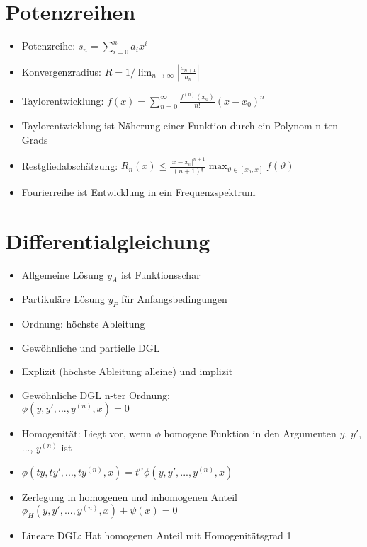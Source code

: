 \documentclass[a4paper,10pt]{article}
\begin{document}
\begin{multicols}{2}
\section {Potenzreihen}
\begin{itemize}
\item Potenzreihe: $s_n = \sum_{i=0}^n a_i x^i$
\item Konvergenzradius: $R = 1/\lim_{n \to \infty} |\frac{a_{n+1}}{a_n}|$
\item Taylorentwicklung: $f(x)=\sum_{n=0}^{\infty} \frac{f^{(n)}(x_0)}{n!} (x-x_0)^n$
\item Taylorentwicklung ist Näherung einer Funktion durch ein Polynom n-ten Grads
\item Restgliedabschätzung: $R_n(x) \le \frac{|x-x_0|^{n+1}}{(n+1)!} \max_{\vartheta \in [x_0,x]} f(\vartheta)$
\item Fourierreihe ist Entwicklung in ein Frequenzspektrum
\end{itemize}

\section {Differentialgleichung}
\begin{itemize}
\item Allgemeine Lösung $y_A$ ist Funktionsschar
\item Partikuläre Lösung $y_P$ für Anfangsbedingungen
\item Ordnung: höchste Ableitung
\item Gewöhnliche und partielle DGL
\item Explizit (höchste Ableitung alleine) und implizit
\item Gewöhnliche DGL n-ter Ordnung:\\
$\phi(y,y',...,y^{(n)},x) = 0$
\item Homogenität: Liegt vor, wenn $\phi$ homogene Funktion in den Argumenten $y$, $y'$, $...$, $y^{(n)}$ ist
\item $\phi(ty,ty',...,ty^{(n)},x) = t^\alpha \phi(y,y',...,y^{(n)},x)$
\item Zerlegung in homogenen und inhomogenen Anteil $\phi_H(y,y',...,y^{(n)},x) + \psi(x) = 0$
\item Lineare DGL: Hat homogenen Anteil mit Homogenitätsgrad 1
\end{itemize}


\end{multicols}
\end{document}
